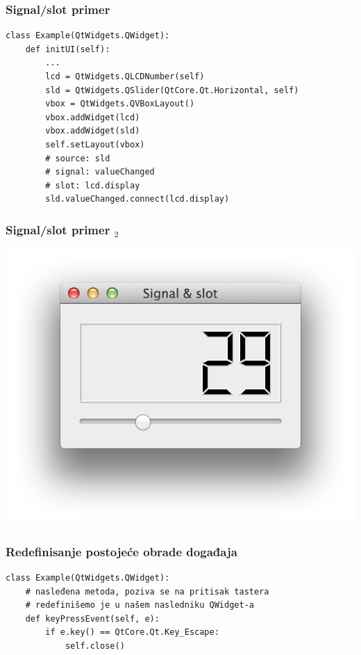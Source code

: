\documentclass[utf8,compress,aspectratio=169]{beamer}
\begin{document}
\begin{frame}
  \frametitle{Signal/slot primer}
\begin{verbatim}
class Example(QtWidgets.QWidget):
    def initUI(self):
        ...
        lcd = QtWidgets.QLCDNumber(self)
        sld = QtWidgets.QSlider(QtCore.Qt.Horizontal, self)
        vbox = QtWidgets.QVBoxLayout()
        vbox.addWidget(lcd)
        vbox.addWidget(sld)
        self.setLayout(vbox)
        # source: sld
        # signal: valueChanged
        # slot: lcd.display
        sld.valueChanged.connect(lcd.display)
\end{verbatim}
\end{frame}

\begin{frame}[fragile]
  \frametitle{Signal/slot primer $_2$}
\begin{center}
\includegraphics[scale=0.5]{pyqt10.png}
\end{center}
\end{frame}

\begin{frame}[fragile]
  \frametitle{Redefinisanje postojeće obrade događaja}
\begin{verbatim}
class Example(QtWidgets.QWidget):
    # nasleđena metoda, poziva se na pritisak tastera
    # redefinišemo je u našem nasledniku QWidget-a
    def keyPressEvent(self, e):
        if e.key() == QtCore.Qt.Key_Escape:
            self.close()
\end{verbatim}
\end{frame}
\end{document}
